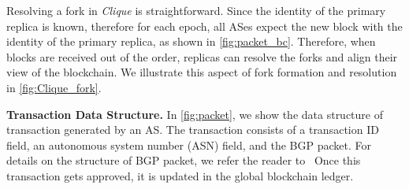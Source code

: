 \documentclass[5p]{elsarticle}
\newcommand{\BfPara}[1]{{\noindent\bf#1.}\xspace}
\begin{document}
Resolving a fork in {\em Clique} is straightforward. Since the identity of the primary replica is known, therefore for each epoch, all ASes expect the new block with the identity of the primary replica, as shown in \autoref{fig:packet_bc}. Therefore, when blocks are received out of the order, replicas can resolve the forks and align their view of the blockchain. We illustrate this aspect of fork formation and resolution in \autoref{fig:Clique_fork}. 






\BfPara{Transaction Data Structure}\label{secc:tds}
In \autoref{fig:packet}, we show the data structure of transaction generated by an AS. The transaction consists of a transaction ID field, an autonomous system number (ASN) field, and the BGP packet. For details on the structure of BGP packet, we refer the reader to~\cite{rfc4271} Once this transaction gets approved, it is updated in the global blockchain ledger. 

\end{document}
